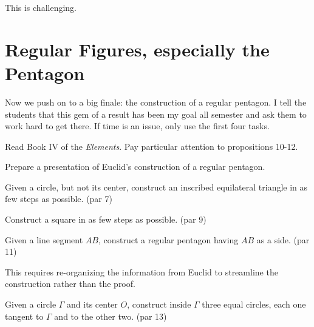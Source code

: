 \begin{annotation}
{
\color{blue}
This is challenging. 
}
\end{annotation}

\chapter{Regular Figures, especially the Pentagon}

\begin{annotation}
{
\color{blue}
Now we push on to a big finale: the construction of a regular pentagon. I tell the students that this gem of a result has been my goal all semester and ask them to work hard to get there. If time is an issue, only use the first four tasks.
}
\end{annotation}

Read Book IV of the \emph{Elements}. Pay particular attention to propositions 10-12.

\begin{problem}\label{prob:GSP-reg-pentagon}
Prepare a presentation of Euclid's construction of a regular pentagon.
\end{problem}

\begin{problem}\label{prob:circle-inscribe-triangle} Given a circle, but not its center, construct an inscribed equilateral triangle in as few steps as possible. (par 7)
\end{problem}

\begin{problem}\label{prob:square}
Construct a square in as few steps as possible. (par 9)
\end{problem}

\begin{problem}\label{prob:side-reg-pent}
Given a line segment $AB$, construct a regular pentagon having $AB$ as a side. (par 11)
\end{problem}

\begin{annotation}
{
\color{blue}
This requires re-organizing the information from Euclid to streamline the construction rather than the proof. 
}
\end{annotation}


\begin{problem}\label{prob:circle-three-tangent-circles}
Given a circle $\Gamma$ and its center $O$, construct inside $\Gamma$ three equal circles, each one tangent to $\Gamma$ and to the other two. (par 13)
\end{problem}

